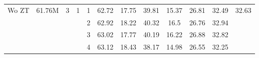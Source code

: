 \begin{table}[]
\begin{tabular}{c|c|c|c|c|ccccc|c|c}
\multirow{4}{*}{Wo ZT}   & \multirow{4}{*}{61.76M} & \multirow{4}{*}{3}                                             & \multirow{4}{*}{1}                                                & 1                                                              & 62.72       & 17.75          & 39.81          & 15.37       & 26.81       & 32.49        & \multirow{4}{*}{32.63} \\
                         &                         &                                                                &                                                                   & 2                                                              & 62.92       & 18.22          & 40.32          & 16.5        & 26.76       & 32.94        &                        \\
                         &                         &                                                                &                                                                   & 3                                                              & 63.02       & 17.77          & 40.19          & 16.22       & 26.88       & 32.82        &                        \\
                         &                         &                                                                &                                                                   & 4                                                              & 63.12       & 18.43          & 38.17          & 14.98       & 26.55       & 32.25        &                        \\ \hline
\end{tabular}
 \vspace{-0.5cm}
\end{table}